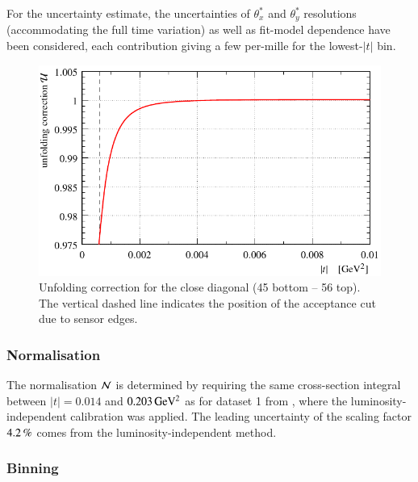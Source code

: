 For the uncertainty estimate, the uncertainties of $\theta_x^*$ and $\theta_y^*$ resolutions (accommodating the full time variation) as well as fit-model dependence have been considered, each contribution giving a few per-mille for the lowest-$|t|$ bin.

\begin{figure}
\begin{center}
\includegraphics{fig/unfolding.pdf}
\caption{%
Unfolding correction for the close diagonal (45 bottom -- 56 top). The vertical dashed line indicates the position of the acceptance cut due to sensor edges.
}
\label{fig:unfolding}
\end{center}
\end{figure}


\subsubsection{Normalisation}
\label{sec:normalisation}

The normalisation ${\cal N}$ is determined by requiring the same cross-section integral between $|t| = 0.014$ and $0.203\,{\rm GeV^2}$ as for dataset 1 from \cite{prl111}, where the luminosity-independent calibration was applied. The leading uncertainty of the scaling factor $4.2\,{\rm \%}$ comes from the luminosity-independent method.



\subsubsection{Binning}
\label{sec:binning}

